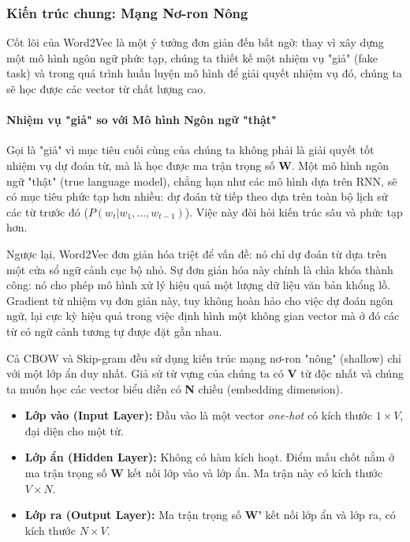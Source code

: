 \subsubsection{Kiến trúc chung: Mạng Nơ-ron Nông}
\label{sssec:w2v_architecture}
Cốt lõi của Word2Vec là một ý tưởng đơn giản đến bất ngờ: thay vì xây dựng một mô hình ngôn ngữ phức tạp, chúng ta thiết kế một nhiệm vụ "giả" (fake task) và trong quá trình huấn luyện mô hình để giải quyết nhiệm vụ đó, chúng ta sẽ học được các vector từ chất lượng cao.

\paragraph{Nhiệm vụ "giả" so với Mô hình Ngôn ngữ "thật"}
Gọi là "giả" vì mục tiêu cuối cùng của chúng ta không phải là giải quyết tốt nhiệm vụ dự đoán từ, mà là học được ma trận trọng số \textbf{W}. Một mô hình ngôn ngữ "thật" (true language model), chẳng hạn như các mô hình dựa trên RNN, sẽ có mục tiêu phức tạp hơn nhiều: dự đoán từ tiếp theo dựa trên toàn bộ lịch sử các từ trước đó ($P(w_t | w_1, ..., w_{t-1})$). Việc này đòi hỏi kiến trúc sâu và phức tạp hơn.

Ngược lại, Word2Vec đơn giản hóa triệt để vấn đề: nó chỉ dự đoán từ dựa trên một cửa sổ ngữ cảnh cục bộ nhỏ. Sự đơn giản hóa này chính là chìa khóa thành công: nó cho phép mô hình xử lý hiệu quả một lượng dữ liệu văn bản khổng lồ. Gradient từ nhiệm vụ đơn giản này, tuy không hoàn hảo cho việc dự đoán ngôn ngữ, lại cực kỳ hiệu quả trong việc định hình một không gian vector mà ở đó các từ có ngữ cảnh tương tự được đặt gần nhau.

Cả CBOW và Skip-gram đều sử dụng kiến trúc mạng nơ-ron "nông" (shallow) chỉ với một lớp ẩn duy nhất. Giả sử từ vựng của chúng ta có \textbf{V} từ độc nhất và chúng ta muốn học các vector biểu diễn có \textbf{N} chiều (embedding dimension).

\begin{itemize}
    \item \textbf{Lớp vào (Input Layer):} Đầu vào là một vector \textit{one-hot} có kích thước $1 \times V$, đại diện cho một từ.
    \item \textbf{Lớp ẩn (Hidden Layer):} Không có hàm kích hoạt. Điểm mấu chốt nằm ở ma trận trọng số \textbf{W} kết nối lớp vào và lớp ẩn. Ma trận này có kích thước $V \times N$.
    \item \textbf{Lớp ra (Output Layer):} Ma trận trọng số \textbf{W'} kết nối lớp ẩn và lớp ra, có kích thước $N \times V$.
\end{itemize}

